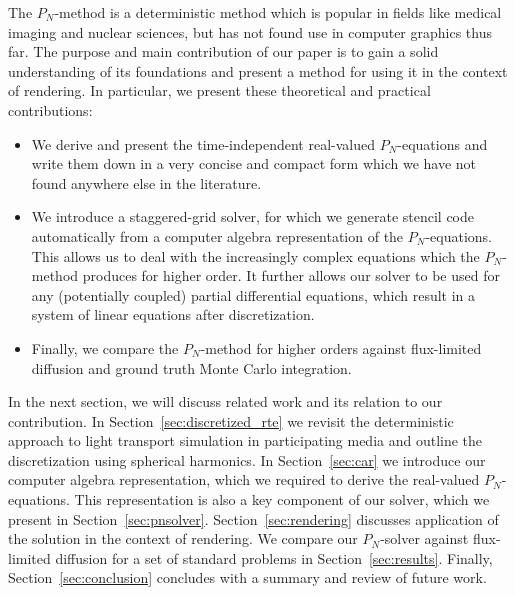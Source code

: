 The $P_N$-method is a deterministic method which is popular in fields like medical imaging and nuclear sciences, but has not found use in computer graphics thus far. The purpose and main contribution of our paper is to gain a solid understanding of its foundations and present a method for using it in the context of rendering. In particular, we present these theoretical and practical contributions:
\begin{itemize}
	\item We derive and present the time-independent real-valued $P_N$-equations and write them down in a very concise and compact form which we have not found anywhere else in the literature.
	\item We introduce a staggered-grid solver, for which we generate stencil code automatically from a computer algebra representation of the $P_N$-equations. This allows us to deal with the increasingly complex equations which the $P_N$-method produces for higher order. It further allows our solver to be used for any (potentially coupled) partial differential equations, which result in a system of linear equations after discretization.
	\item Finally, we compare the $P_N$-method for higher orders against flux-limited diffusion and ground truth Monte Carlo integration.
\end{itemize}

In the next section, we will discuss related work and its relation to our contribution. In Section~\ref{sec:discretized_rte} we revisit the deterministic approach to light transport simulation in participating media and outline the discretization using spherical harmonics. In Section~\ref{sec:car} we introduce our computer algebra representation, which we required to derive the real-valued $P_N$-equations. This representation is also a key component of our solver, which we present in Section~\ref{sec:pnsolver}. Section~\ref{sec:rendering} discusses application of the solution in the context of rendering. We compare our $P_N$-solver against flux-limited diffusion for a set of standard problems in Section~\ref{sec:results}. Finally, Section~\ref{sec:conclusion} concludes with a summary and review of future work.